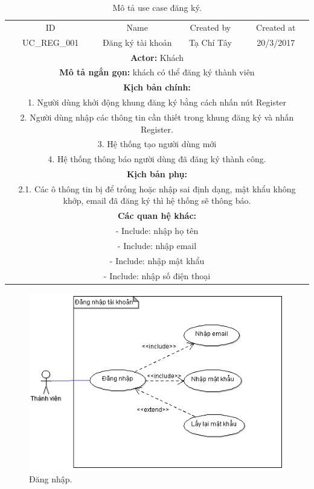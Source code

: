 \documentclass[a4paper,12pt,oneside]{article}
\begin{document}
\begin{table}[!htp]
\centering
\begin{tabularx}{\linewidth}{ |c||c|c|c| }
\hline
ID & Name & Created by & Created at\\
UC\_REG\_001 & Đăng ký tài khoản & Tạ Chí Tây & 20/3/2017\\
\hline
\multicolumn{4}{|X|}{\textbf{Actor:} Khách }\\
\hline
\multicolumn{4}{|X|}{\textbf{Mô tả ngắn gọn:} khách có thể đăng ký thành viên }\\
\hline
\multicolumn{4}{|X|}{\textbf{Kịch bản chính:}}\\
\multicolumn{4}{|X|}{1. Người dùng khởi động khung đăng ký bằng cách nhấn nút Register}\\
\multicolumn{4}{|X|}{
2.	Người dùng nhập các thông tin cần thiết trong khung đăng ký và nhấn Register.}\\
\multicolumn{4}{|X|}{
3.	Hệ thống tạo người dùng mới}\\
\multicolumn{4}{|X|}{
4.	Hệ thống thông báo người dùng đã đăng ký thành công.}\\
\hline
\multicolumn{4}{|X|}{\textbf{Kịch bản phụ:}}\\
\multicolumn{4}{|X|}{2.1. Các ô thông tin bị để trống hoặc nhập sai định dạng, mật khẩu không khớp, email đã đăng ký thì hệ thống sẽ thông báo.}\\
\hline
\multicolumn{4}{|X|}{\textbf{Các quan hệ khác:}}\\
\multicolumn{4}{|X|}{- Include: nhập họ tên}\\
\multicolumn{4}{|X|}{- Include: nhập email}\\
\multicolumn{4}{|X|}{- Include: nhập mật khẩu}\\
\multicolumn{4}{|X|}{- Include: nhập số điện thoại}\\
\hline
\end{tabularx}
\caption{Mô tả use case đăng ký.}
\end{table}

\begin{figure}[H]	
	\centering
	\includegraphics[scale=.9]{hinh/login.png}
	\caption{Đăng nhập.}
\end{figure}
\end{document}
